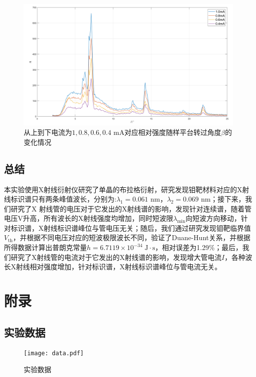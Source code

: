 \documentclass{whureport}
\begin{document}
\begin{figure}[H]
	\centering
	\includegraphics[scale=0.55]{current.png}
	\captionsetup{font=footnotesize}
	\caption{从上到下电流为$1,0.8,0.6,0.4$ mA对应相对强度随样平台转过角度$\beta$的变化情况}
	\label{fig:current}
\end{figure}
\begin{multicols}{2}

	\section{总结}
	本实验使用X射线衍射仪研究了单晶的布拉格衍射，研究发现钼靶材料对应的X射线标识谱只有两条峰值波长，分别为:$\lambda_1=0.061$ nm，$\lambda_2=0.069$ nm；接下来，我们研究了X 射线管的电压对于它发出的X射线谱的影响，发现针对连续谱，随着管电压V升高，所有波长的X射线强度均增加，同时短波限$\lambda_{\min}$向短波方向移动，针对标识谱，X射线标识谱峰位与管电压无关；随后，我们通过研究发现钼靶临界值$V_{\text{th}}$，并根据不同电压对应的短波极限波长不同，验证了Duane-Hunt关系，并根据所得数据计算出普朗克常量$h=6.7119\times10^{-34}\;\text{J}\cdot\text{s}$，相对误差为1.29\%；最后，我们研究了X射线管的电流对于它发出的X射线谱的影响，发现增大管电流$I$，各种波长X射线相对强度增加，针对标识谱，X射线标识谱峰位与管电流无关。
	\printbibliography
\end{multicols}
\newpage
\section{附录}
\subsection{实验数据}
\begin{figure}[H]
	\centering
	\texttt{[image: data.pdf]}
	\captionsetup{font=footnotesize}
	\caption{实验数据}
	\label{fig:data}
\end{figure}
\end{document}
